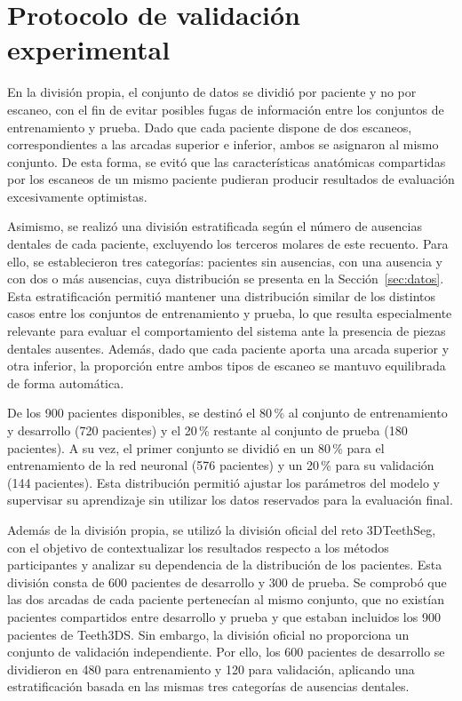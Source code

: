 \section{Protocolo de validación experimental}
\label{sec:protocolo}

En la división propia, el conjunto de datos se dividió por paciente y no por escaneo, con el fin de evitar posibles fugas de información entre los conjuntos de entrenamiento y prueba. Dado que cada paciente dispone de dos escaneos, correspondientes a las arcadas superior e inferior, ambos se asignaron al mismo conjunto. De esta forma, se evitó que las características anatómicas compartidas por los escaneos de un mismo paciente pudieran producir resultados de evaluación excesivamente optimistas.

Asimismo, se realizó una división estratificada según el número de ausencias dentales de cada paciente, excluyendo los terceros molares de este recuento. Para ello, se establecieron tres categorías: pacientes sin ausencias, con una ausencia y con dos o más ausencias, cuya distribución se presenta en la Sección~\ref{sec:datos}. Esta estratificación permitió mantener una distribución similar de los distintos casos entre los conjuntos de entrenamiento y prueba, lo que resulta especialmente relevante para evaluar el comportamiento del sistema ante la presencia de piezas dentales ausentes. Además, dado que cada paciente aporta una arcada superior y otra inferior, la proporción entre ambos tipos de escaneo se mantuvo equilibrada de forma automática.

De los 900 pacientes disponibles, se destinó el 80\,\% al conjunto de entrenamiento y desarrollo (720 pacientes) y el 20\,\% restante al conjunto de prueba (180 pacientes). A su vez, el primer conjunto se dividió en un 80\,\% para el entrenamiento de la red neuronal (576 pacientes) y un 20\,\% para su validación (144 pacientes). Esta distribución permitió ajustar los parámetros del modelo y supervisar su aprendizaje sin utilizar los datos reservados para la evaluación final.

Además de la división propia, se utilizó la división oficial del reto 3DTeethSeg, con el objetivo de contextualizar los resultados respecto a los métodos participantes y analizar su dependencia de la distribución de los pacientes. Esta división consta de 600 pacientes de desarrollo y 300 de prueba. Se comprobó que las dos arcadas de cada paciente pertenecían al mismo conjunto, que no existían pacientes compartidos entre desarrollo y prueba y que estaban incluidos los 900 pacientes de Teeth3DS. Sin embargo, la división oficial no proporciona un conjunto de validación independiente. Por ello, los 600 pacientes de desarrollo se dividieron en 480 para entrenamiento y 120 para validación, aplicando una estratificación basada en las mismas tres categorías de ausencias dentales.

